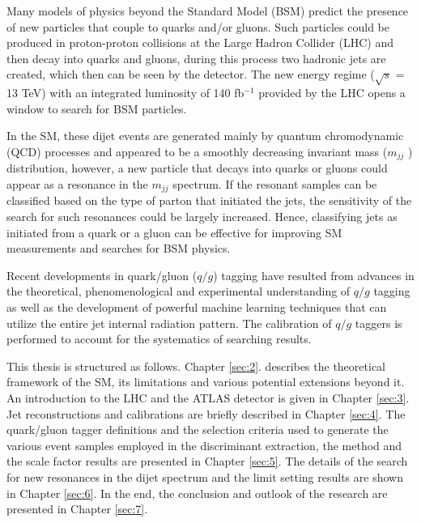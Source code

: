 \documentclass[UTF8,12pt]{ctexart}
\numberwithin{equation}{section}
\def\mjj{$m_{jj}$ }
\def\ifb{fb$^{-1}$ }
\begin{document}
Many models of physics beyond the Standard Model (BSM) predict the presence of new particles that couple to quarks and/or gluons. Such particles could be produced in proton-proton collisions at the Large Hadron Collider (LHC) and then decay into quarks and gluons, during this process two hadronic jets are created, which then can be seen by the detector. The new energy regime ($\sqrt{s}$ = 13 TeV) with an integrated luminosity of 140 \ifb provided by the LHC opens a window to search for BSM particles. 

In the SM, these dijet events are generated mainly by quantum chromodynamic (QCD) processes and appeared to be a smoothly decreasing invariant mass (\mjj) distribution, however, a new particle that decays into quarks or gluons could appear as a resonance in the \mjj spectrum. If the resonant samples can be classified based on the type of parton that initiated the jets, the sensitivity of the search for such resonances could be largely increased. Hence, classifying jets as initiated from a quark or a gluon can be effective for improving SM measurements and searches for BSM physics. 

Recent developments in quark/gluon ($q/g$) tagging have resulted from advances in the theoretical, phenomenological and experimental understanding of $q/g$ tagging as well as the development of powerful machine learning techniques that can utilize the entire jet internal radiation pattern. The calibration of $q/g$ taggers is performed to account for the systematics of searching results. 


This thesis is structured as follows. Chapter \ref{sec:2}. describes the theoretical framework of the SM, its limitations and various potential extensions beyond it. An introduction to the LHC and the ATLAS detector is given in Chapter \ref{sec:3}. Jet reconstructions and calibrations are briefly described in Chapter \ref{sec:4}. The quark/gluon tagger definitions and the selection criteria used to generate the various event samples employed in the discriminant extraction, the method and the scale factor results are presented in Chapter \ref{sec:5}. The details of the search for new resonances in the dijet spectrum and the limit setting results are shown in Chapter \ref{sec:6}. In the end, the conclusion and outlook of the research are presented in Chapter \ref{sec:7}.







\newpage
{}
\end{document}
